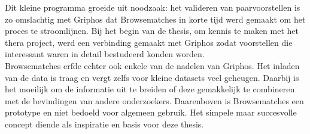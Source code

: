 Dit kleine programma groeide uit noodzaak: het valideren van paarvoorstellen is zo omslachtig met Griphos dat Browsematches in korte tijd werd gemaakt om het proces te stroomlijnen. Bij het begin van de thesis, om kennis te maken met het thera project, werd een verbinding gemaakt met Griphos zodat voorstellen die interessant waren in detail bestudeerd konden worden.\\

Browsematches erfde echter ook enkele van de nadelen van Griphos. Het inladen van de data is traag en vergt zelfs voor kleine datasets veel geheugen. Daarbij is het moeilijk om de informatie uit te breiden of deze gemakkelijk te combineren met de bevindingen van andere onderzoekers. Daarenboven is Browsematches een prototype en niet bedoeld voor algemeen gebruik. Het simpele maar succesvolle concept diende als inspiratie en basis voor deze thesis. 

